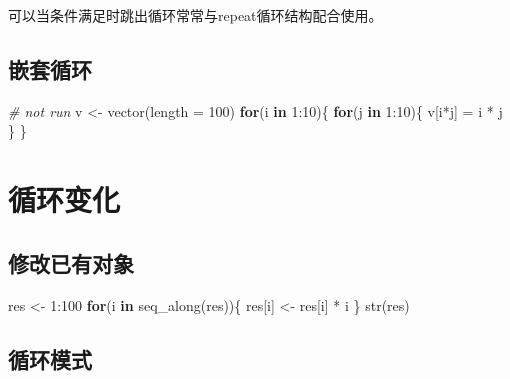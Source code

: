 \documentclass[
]{book}
\newenvironment{Shaded}{\begin{snugshade}}{\end{snugshade}}
\newcommand{\AttributeTok}[1]{\textcolor[rgb]{0.77,0.63,0.00}{#1}}
\newcommand{\CommentTok}[1]{\textcolor[rgb]{0.56,0.35,0.01}{\textit{#1}}}
\newcommand{\ControlFlowTok}[1]{\textcolor[rgb]{0.13,0.29,0.53}{\textbf{#1}}}
\newcommand{\DecValTok}[1]{\textcolor[rgb]{0.00,0.00,0.81}{#1}}
\newcommand{\FunctionTok}[1]{\textcolor[rgb]{0.00,0.00,0.00}{#1}}
\newcommand{\NormalTok}[1]{#1}
\newcommand{\OtherTok}[1]{\textcolor[rgb]{0.56,0.35,0.01}{#1}}
\newcommand{\SpecialCharTok}[1]{\textcolor[rgb]{0.00,0.00,0.00}{#1}}
\begin{document}
可以当条件满足时跳出循环常常与repeat循环结构配合使用。

\hypertarget{ux5d4cux5957ux5faaux73af}{%
\subsection{嵌套循环}\label{ux5d4cux5957ux5faaux73af}}

\begin{Shaded}
\begin{Highlighting}[]
\CommentTok{\# not run}
\NormalTok{v }\OtherTok{\textless{}{-}} \FunctionTok{vector}\NormalTok{(}\AttributeTok{length =} \DecValTok{100}\NormalTok{)}
\ControlFlowTok{for}\NormalTok{(i }\ControlFlowTok{in} \DecValTok{1}\SpecialCharTok{:}\DecValTok{10}\NormalTok{)\{}
  \ControlFlowTok{for}\NormalTok{(j }\ControlFlowTok{in} \DecValTok{1}\SpecialCharTok{:}\DecValTok{10}\NormalTok{)\{}
\NormalTok{    v[i}\SpecialCharTok{*}\NormalTok{j] }\OtherTok{=}\NormalTok{ i }\SpecialCharTok{*}\NormalTok{ j }
\NormalTok{  \}}
\NormalTok{\}}
\end{Highlighting}
\end{Shaded}

\hypertarget{ux5faaux73afux53d8ux5316}{%
\section{循环变化}\label{ux5faaux73afux53d8ux5316}}

\hypertarget{ux4feeux6539ux5df2ux6709ux5bf9ux8c61}{%
\subsection{修改已有对象}\label{ux4feeux6539ux5df2ux6709ux5bf9ux8c61}}

\begin{Shaded}
\begin{Highlighting}[]
\NormalTok{res }\OtherTok{\textless{}{-}} \DecValTok{1}\SpecialCharTok{:}\DecValTok{100}
\ControlFlowTok{for}\NormalTok{(i }\ControlFlowTok{in} \FunctionTok{seq\_along}\NormalTok{(res))\{}
\NormalTok{  res[i] }\OtherTok{\textless{}{-}}\NormalTok{ res[i] }\SpecialCharTok{*}\NormalTok{ i}
\NormalTok{\}}
\FunctionTok{str}\NormalTok{(res)}
\end{Highlighting}
\end{Shaded}

\hypertarget{ux5faaux73afux6a21ux5f0f}{%
\subsection{循环模式}\label{ux5faaux73afux6a21ux5f0f}}
\end{document}
